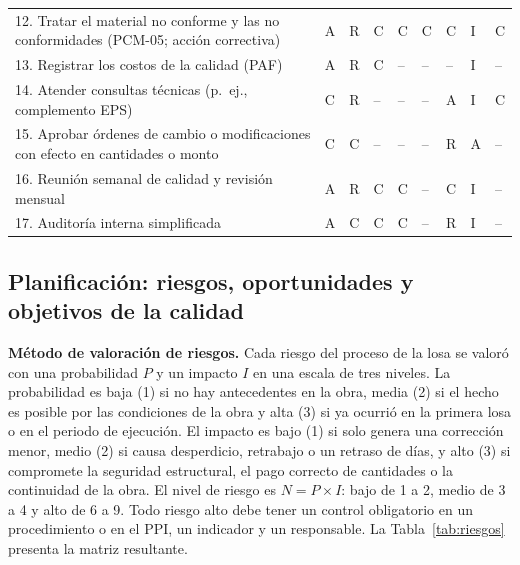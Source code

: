 \begin{longtable}{@{}P{6.1cm}*{8}{Q{0.98cm}}@{}}
12. Tratar el material no conforme y las no conformidades (PCM-05; acción correctiva) & A & R & C & C & C & C & I & C \\
13. Registrar los costos de la calidad (PAF) & A & R & C & -- & -- & -- & I & -- \\
14. Atender consultas técnicas (p.~ej., complemento EPS) & C & R & -- & -- & -- & A & I & C \\
15. Aprobar órdenes de cambio o modificaciones con efecto en cantidades o monto & C & C & -- & -- & -- & R & A & -- \\
16. Reunión semanal de calidad y revisión mensual & A & R & C & C & -- & C & I & -- \\
17. Auditoría interna simplificada & A & C & C & C & -- & R & I & -- \\
\end{longtable}
\vspace{-6pt}
\endgroup

\subsection{Planificación: riesgos, oportunidades y objetivos de la calidad}
\label{sec:sgc-planificacion}

\textbf{Método de valoración de riesgos.} Cada riesgo del proceso de la losa se valoró con una probabilidad $P$ y un impacto $I$ en una escala de tres niveles. La probabilidad es baja (1) si no hay antecedentes en la obra, media (2) si el hecho es posible por las condiciones de la obra y alta (3) si ya ocurrió en la primera losa o en el periodo de ejecución. El impacto es bajo (1) si solo genera una corrección menor, medio (2) si causa desperdicio, retrabajo o un retraso de días, y alto (3) si compromete la seguridad estructural, el pago correcto de cantidades o la continuidad de la obra. El nivel de riesgo es $N = P \times I$: bajo de 1 a 2, medio de 3 a 4 y alto de 6 a 9. Todo riesgo alto debe tener un control obligatorio en un procedimiento o en el PPI, un indicador y un responsable. La Tabla~\ref{tab:riesgos} presenta la matriz resultante.

